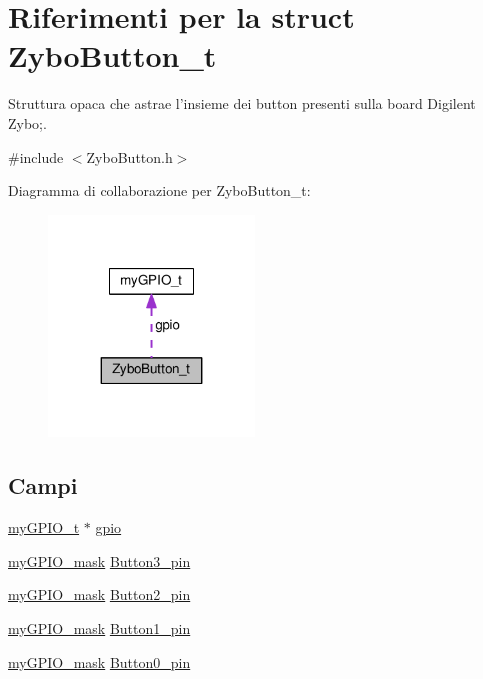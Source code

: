 \hypertarget{struct_zybo_button__t}{\section{Riferimenti per la struct Zybo\+Button\+\_\+t}
\label{struct_zybo_button__t}
}


Struttura opaca che astrae l'insieme dei button presenti sulla board Digilent Zybo;.  




{\ttfamily \#include $<$Zybo\+Button.\+h$>$}



Diagramma di collaborazione per Zybo\+Button\+\_\+t\+:\nopagebreak
\begin{figure}[H]
\begin{center}
\leavevmode
\includegraphics[width=155pt]{struct_zybo_button__t__coll__graph}
\end{center}
\end{figure}
\subsection*{Campi}
\begin{DoxyCompactItemize}
\item 
\hyperlink{structmy_g_p_i_o__t}{my\+G\+P\+I\+O\+\_\+t} $\ast$ \hyperlink{struct_zybo_button__t_ac37ddc7c58d246d233dfb38037020184}{gpio}
\item 
\hyperlink{group__bare-metal_ga402a0d20afc0cb7c25554b8b023f4253}{my\+G\+P\+I\+O\+\_\+mask} \hyperlink{struct_zybo_button__t_ad462a15a55883fd4c86d2be9e11968a7}{Button3\+\_\+pin}
\item 
\hyperlink{group__bare-metal_ga402a0d20afc0cb7c25554b8b023f4253}{my\+G\+P\+I\+O\+\_\+mask} \hyperlink{struct_zybo_button__t_a3b4fe634c2d98ce55fdef526c2d230d1}{Button2\+\_\+pin}
\item 
\hyperlink{group__bare-metal_ga402a0d20afc0cb7c25554b8b023f4253}{my\+G\+P\+I\+O\+\_\+mask} \hyperlink{struct_zybo_button__t_a6cb60bb285e32e29c51c15e85206aaeb}{Button1\+\_\+pin}
\item 
\hyperlink{group__bare-metal_ga402a0d20afc0cb7c25554b8b023f4253}{my\+G\+P\+I\+O\+\_\+mask} \hyperlink{struct_zybo_button__t_af7d7d5a9c9fc174e8f4ee4c762c2abee}{Button0\+\_\+pin}
\end{DoxyCompactItemize}


